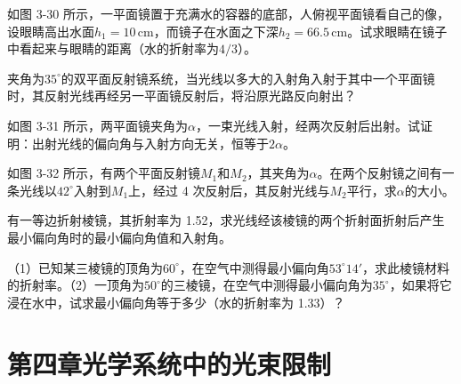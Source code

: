 \documentclass[padl, analysis, notocnum]{ExBook}
\newcommand{\answerarea}[1][3.5cm]{%
  \par\vspace{1mm}%
  \noindent{\color{themeColor!35}\rule{\linewidth}{0.4pt}}\par
  \noindent\begin{minipage}[t][#1][t]{\linewidth}\vspace{0pt}\end{minipage}\par
  \noindent{\color{themeColor!35}\rule{\linewidth}{0.4pt}}\par
}
\begin{document}
\begin{qitems}[startnum=2]
\qitem 如图 3-30 所示，一平面镜置于充满水的容器的底部，人俯视平面镜看自己的像，设眼睛高出水面$h_{1}=10\,\mathrm{cm}$，而镜子在水面之下深$h_{2}=66.5\,\mathrm{cm}$。试求眼睛在镜子中看起来与眼睛的距离（水的折射率为$4/3$）。
\label{q:64:start}
\answerarea[2.4cm]
\label{q:64:end}
\end{qitems}

\begin{qitems}[startnum=3]
\qitem 夹角为$35^{\circ}$的双平面反射镜系统，当光线以多大的入射角入射于其中一个平面镜时，其反射光线再经另一平面镜反射后，将沿原光路反向射出？
\label{q:65:start}
\answerarea[7.0cm]
\label{q:65:end}
\end{qitems}

\begin{qitems}[startnum=4]
\qitem 如图 3-31 所示，两平面镜夹角为$\alpha$，一束光线入射，经两次反射后出射。试证明：出射光线的偏向角与入射方向无关，恒等于$2\alpha$。
\label{q:66:start}
\answerarea[2.4cm]
\label{q:66:end}
\end{qitems}

\begin{qitems}[startnum=5]
\qitem 如图 3-32 所示，有两个平面反射镜$M_{1}$和$M_{2}$，其夹角为$\alpha$。在两个反射镜之间有一条光线以$42^{\circ}$入射到$M_{1}$上，经过 4 次反射后，其反射光线与$M_{2}$平行，求$\alpha$的大小。
\label{q:67:start}
\answerarea[2.4cm]
\label{q:67:end}
\end{qitems}

\begin{qitems}[startnum=6]
\qitem 有一等边折射棱镜，其折射率为 1.52，求光线经该棱镜的两个折射面折射后产生最小偏向角时的最小偏向角值和入射角。
\label{q:68:start}
\answerarea[7.0cm]
\label{q:68:end}
\end{qitems}

\begin{qitems}[startnum=7]
\qitem （1）已知某三棱镜的顶角为$60^{\circ}$，在空气中测得最小偏向角$53^{\circ}14'$，求此棱镜材料的折射率。（2）一顶角为$50^{\circ}$的三棱镜，在空气中测得最小偏向角为$35^{\circ}$，如果将它浸在水中，试求最小偏向角等于多少（水的折射率为 1.33）？
\label{q:69:start}
\answerarea[7.0cm]
\label{q:69:end}
\end{qitems}

\section{第四章\quad 光学系统中的光束限制}
\end{document}
